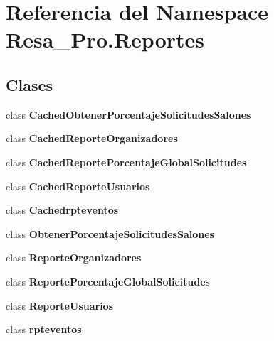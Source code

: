 \section{Referencia del Namespace Resa\+\_\+\+Pro.\+Reportes}
\label{namespace_resa___pro_1_1_reportes}
\subsection*{Clases}
\begin{DoxyCompactItemize}
\item 
class {\bf Cached\+Obtener\+Porcentaje\+Solicitudes\+Salones}
\item 
class {\bf Cached\+Reporte\+Organizadores}
\item 
class {\bf Cached\+Reporte\+Porcentaje\+Global\+Solicitudes}
\item 
class {\bf Cached\+Reporte\+Usuarios}
\item 
class {\bf Cachedrpteventos}
\item 
class {\bf Obtener\+Porcentaje\+Solicitudes\+Salones}
\item 
class {\bf Reporte\+Organizadores}
\item 
class {\bf Reporte\+Porcentaje\+Global\+Solicitudes}
\item 
class {\bf Reporte\+Usuarios}
\item 
class {\bf rpteventos}
\end{DoxyCompactItemize}
